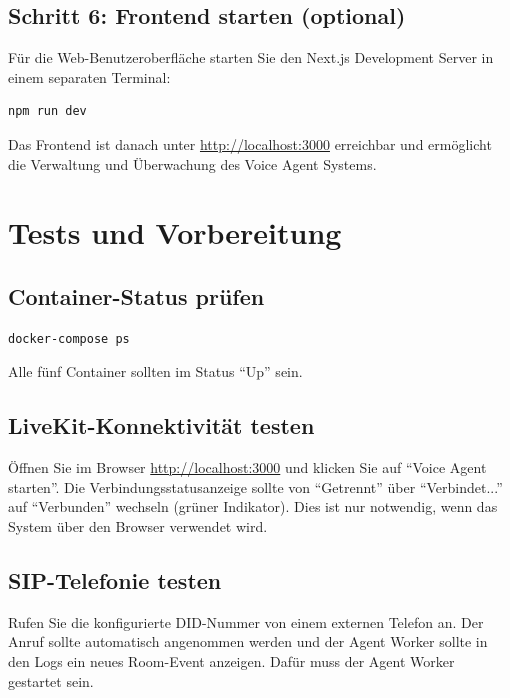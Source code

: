 \subsection{Schritt 6: Frontend starten (optional)}

Für die Web-Benutzeroberfläche starten Sie den Next.js Development Server in einem separaten Terminal:
\clearpage
\begin{lstlisting}[language=bash,caption={Next.js Development Server starten}]
npm run dev
\end{lstlisting}

\noindent Das Frontend ist danach unter \url{http://localhost:3000} erreichbar und ermöglicht die Verwaltung und Überwachung des Voice Agent Systems.

\section{Tests und Vorbereitung}

\subsection{Container-Status prüfen}

\begin{lstlisting}[language=bash,caption={Status aller Docker-Container anzeigen}]
docker-compose ps
\end{lstlisting}

\noindent Alle fünf Container sollten im Status ``Up'' sein.

\subsection{LiveKit-Konnektivität testen}

Öffnen Sie im Browser \url{http://localhost:3000} und klicken Sie auf ``Voice Agent starten''. Die Verbindungsstatusanzeige sollte von ``Getrennt'' über ``Verbindet...'' auf ``Verbunden'' wechseln (grüner Indikator). Dies ist nur notwendig, wenn das System über den Browser verwendet wird.

\subsection{SIP-Telefonie testen}

Rufen Sie die konfigurierte DID-Nummer von einem externen Telefon an. Der Anruf sollte automatisch angenommen werden und der Agent Worker sollte in den Logs ein neues Room-Event anzeigen. Dafür muss der Agent Worker gestartet sein.
\clearpage
